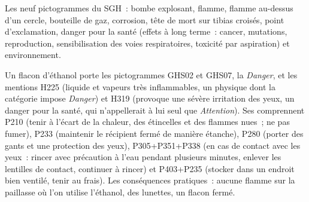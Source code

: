 \begin{omfigure}
\smallskip
{\small Les neuf pictogrammes du SGH~: bombe explosant, flamme, flamme
au-dessus d'un cercle, bouteille de gaz, corrosion, tête de mort sur
tibias croisés, point d'exclamation, danger pour la santé (effets à long
terme~: cancer, mutations, reproduction, sensibilisation des voies
respiratoires, toxicité par aspiration) et environnement.}
\end{omfigure}

\begin{example}
Un flacon d'éthanol porte les pictogrammes GHS02 et GHS07, la  \emph{Danger}, et les mentions H225 (liquide et vapeurs
très inflammables, un  physique dont la catégorie impose
\emph{Danger}) et H319 (provoque une sévère irritation des yeux, un
danger pour la santé, qui n'appellerait à lui seul que
\emph{Attention}). Ses  comprennent P210 (tenir à
l'écart de la chaleur, des étincelles et des flammes nues~; ne pas
fumer), P233 (maintenir le récipient fermé de manière étanche), P280
(porter des gants et une protection des yeux), P305+P351+P338 (en cas de
contact avec les yeux~: rincer avec précaution à l'eau pendant plusieurs
minutes, enlever les lentilles de contact, continuer à rincer) et
P403+P235 (stocker dans un endroit bien ventilé, tenir au frais). Les
conséquences pratiques~: aucune flamme sur la paillasse où l'on utilise
l'éthanol, des lunettes, un flacon fermé.
\end{example}

